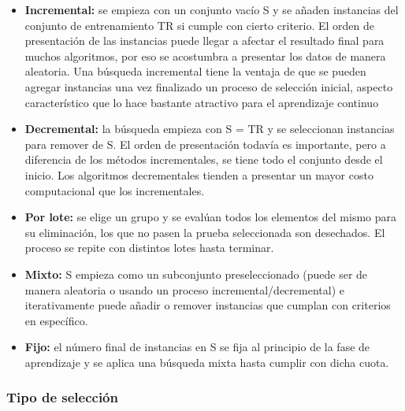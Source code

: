 \begin{itemize}
\item \textbf{Incremental:}
se empieza con un conjunto vacío S y se añaden instancias del conjunto de entrenamiento TR si cumple con cierto criterio. El orden de presentación de las instancias puede llegar a afectar el resultado final para muchos algoritmos, por eso se acostumbra a presentar los datos de manera aleatoria. Una búsqueda incremental tiene la ventaja de que se pueden agregar instancias una vez finalizado un proceso de selección inicial, aspecto característico que lo hace bastante atractivo para el aprendizaje continuo

\item \textbf{Decremental:}
la búsqueda empieza con S = TR  y se seleccionan instancias para remover de S. El orden de presentación todavía es importante, pero a diferencia de los métodos incrementales, se tiene todo el conjunto desde el inicio. Los algoritmos decrementales tienden a presentar un mayor costo computacional que los incrementales.

\item \textbf{Por lote:}
se elige un grupo y se evalúan todos los elementos del mismo para su eliminación, los que no pasen la prueba seleccionada son desechados. El proceso se repite con distintos lotes hasta terminar.

\item \textbf{Mixto:}
S empieza como un subconjunto preseleccionado (puede ser de manera aleatoria o usando un proceso incremental/decremental) e iterativamente puede añadir o remover instancias que cumplan con criterios en específico.

\item \textbf{Fijo:}
el número final de instancias en S se fija al principio de la fase de aprendizaje y se aplica una búsqueda mixta hasta cumplir con dicha cuota.
\end{itemize}

\subsubsection{Tipo de selección}

